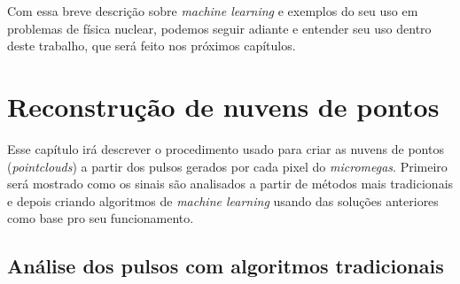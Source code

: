 \documentclass[a4paper,12pt,oneside]{book}
\begin{document}



\par Com essa breve descrição sobre \textit{machine learning} e exemplos do seu uso em problemas de física nuclear, podemos seguir adiante e entender seu uso dentro deste trabalho, que será feito nos próximos capítulos.

\chapter{Reconstrução de nuvens de pontos}\label{chapter:sinais}

\par Esse capítulo irá descrever o procedimento usado para criar as nuvens de pontos (\textit{pointclouds}) a partir dos pulsos gerados por cada pixel do \textit{micromegas}. Primeiro será mostrado como os sinais são analisados a partir de métodos mais tradicionais e depois criando algoritmos de \textit{machine learning} usando das soluções anteriores como base pro seu funcionamento.




\section{Análise dos pulsos com algoritmos tradicionais}\label{sec:pulses_trad}
\end{document}
